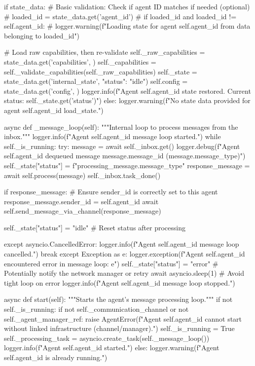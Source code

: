 \documentclass{amsbook}
\theoremstyle{definition}
\theoremstyle{remark}
\numberwithin{equation}{chapter} %
\begin{document}
\begin{python}
        if state_data:
             # Basic validation: Check if agent ID matches if needed (optional)
            # loaded_id = state_data.get('agent_id')
            # if loaded_id and loaded_id != self.agent_id:
            #    logger.warning(f"Loading state for agent {self.agent_id} from data belonging to {loaded_id}")

            # Load raw capabilities, then re-validate
            self._raw_capabilities = state_data.get('capabilities', {})
            self._capabilities = self._validate_capabilities(self._raw_capabilities)
            self._state = state_data.get('internal_state', {"status": "idle"})
            self.config = state_data.get('config', {})
            logger.info(f"Agent {self.agent_id} state restored. Current status: {self._state.get('status')}")
        else:
             logger.warning(f"No state data provided for agent {self.agent_id} load_state.")


    async def _message_loop(self):
        """Internal loop to process messages from the inbox."""
        logger.info(f"Agent {self.agent_id} message loop started.")
        while self._is_running:
            try:
                message = await self._inbox.get()
                logger.debug(f"Agent {self.agent_id} dequeued message {message.message_id} ({message.message_type})")
                self._state["status"] = f"processing_{message.message_type}"
                response_message = await self.process(message)
                self._inbox.task_done()

                if response_message:
                    # Ensure sender_id is correctly set to this agent
                    response_message.sender_id = self.agent_id
                    await self.send_message_via_channel(response_message)

                self._state["status"] = "idle" # Reset status after processing

            except asyncio.CancelledError:
                logger.info(f"Agent {self.agent_id} message loop cancelled.")
                break
            except Exception as e:
                logger.exception(f"Agent {self.agent_id} encountered error in message loop: {e}")
                self._state["status"] = "error"
                # Potentially notify the network manager or retry
                await asyncio.sleep(1) # Avoid tight loop on error
        logger.info(f"Agent {self.agent_id} message loop stopped.")

    async def start(self):
        """Starts the agent's message processing loop."""
        if not self._is_running:
            if not self._communication_channel or not self._agent_manager_ref:
                 raise AgentError(f"Agent {self.agent_id} cannot start without linked infrastructure (channel/manager).")
            self._is_running = True
            self._processing_task = asyncio.create_task(self._message_loop())
            logger.info(f"Agent {self.agent_id} started.")
        else:
            logger.warning(f"Agent {self.agent_id} is already running.")


\end{python}
\end{document}
